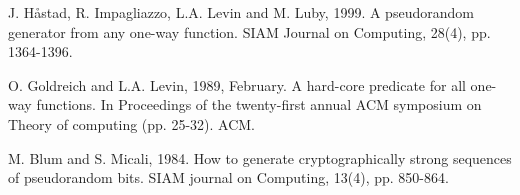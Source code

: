 \documentclass[12pt]{article}
\theoremstyle{definition}
\begin{document}
\begin{thebibliography}{10}
J. H\aa stad, R. Impagliazzo, L.A. Levin and M. Luby, 1999. 
A pseudorandom generator from any one-way function. 
SIAM Journal on Computing, 28(4), pp. 1364-1396.
	
O. Goldreich and L.A. Levin, 1989, February. 
A hard-core predicate for all one-way functions. 
In Proceedings of the twenty-first annual ACM symposium on Theory of computing (pp. 25-32). ACM.

M. Blum and S. Micali, 1984. 
How to generate cryptographically strong sequences of pseudorandom bits. 
SIAM journal on Computing, 13(4), pp. 850-864.
\end{thebibliography}
\end{document}
